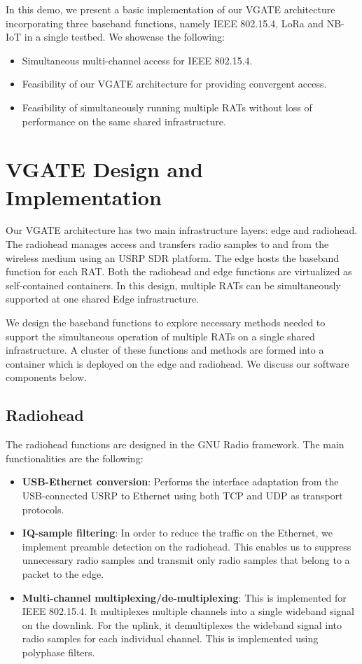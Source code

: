 \documentclass[10pt,emptycopyrightspace]{ewsn-proc}
\begin{document}
In this demo, we present a basic implementation of our VGATE architecture incorporating three baseband functions, namely IEEE 802.15.4, LoRa and NB-IoT in a single testbed. We showcase the following:
\begin{itemize}
	\item Simultaneous multi-channel access for IEEE 802.15.4.
	\item Feasibility of our VGATE architecture for providing convergent access.
	\item Feasibility of simultaneously running multiple RATs without loss of performance on the same shared infrastructure.
\end{itemize}

\section{VGATE Design and Implementation}
\label{sec:implementation}
Our VGATE architecture
has two main infrastructure layers: edge and radiohead. The radiohead manages access and transfers radio samples to and from the wireless medium using an USRP SDR platform.  The edge hosts the baseband function for each RAT. Both the radiohead and edge functions are virtualized as self-contained containers. In this design, multiple RATs can be simultaneously supported at one shared Edge
infrastructure. %


We design the baseband functions to explore necessary methods needed to support the simultaneous operation of multiple RATs on a single shared infrastructure. A cluster of these functions and methods are formed into a container which is deployed on the edge and radiohead. We discuss our software components below. 

\subsection{Radiohead}
The radiohead functions are designed in the GNU Radio framework. The main functionalities are the following:
\begin{itemize}
	\item \textbf{USB-Ethernet conversion}: Performs the interface adaptation from the USB-connected USRP to Ethernet using both TCP and UDP as transport protocols.
	
	\item \textbf{IQ-sample filtering}: In order to reduce the traffic on the Ethernet, we implement preamble detection on the radiohead. This enables us to suppress unnecessary radio samples and transmit only radio samples that belong to a packet to the edge. 
	
	\item \textbf{Multi-channel multiplexing/de-multiplexing}: This is implemented for IEEE 802.15.4. It multiplexes multiple channels into a single wideband signal on the downlink. For the uplink, it demultiplexes the wideband signal into radio samples for each individual channel. This is implemented using polyphase filters.
	
\end{itemize}
\end{document}
